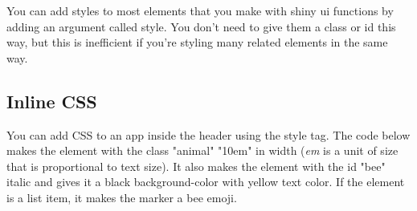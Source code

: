 \documentclass[
  oneside]{book}
\newenvironment{Shaded}{\begin{snugshade}}{\end{snugshade}}
\newcommand{\AttributeTok}[1]{\textcolor[rgb]{0.77,0.63,0.00}{#1}}
\newcommand{\FunctionTok}[1]{\textcolor[rgb]{0.00,0.00,0.00}{#1}}
\newcommand{\NormalTok}[1]{#1}
\newcommand{\SpecialCharTok}[1]{\textcolor[rgb]{0.00,0.00,0.00}{#1}}
\newcommand{\StringTok}[1]{\textcolor[rgb]{0.31,0.60,0.02}{#1}}
\begin{document}
You can add styles to most elements that you make with shiny ui functions by adding an argument called \AttributeTok{style}. You don't need to give them a \NormalTok{class} or \NormalTok{id} this way, but this is inefficient if you're styling many related elements in the same way.

\begin{Shaded}
\end{Shaded}

\hypertarget{inline-css}{%
\subsection{Inline CSS}\label{inline-css}}

You can add CSS to an app inside the header using the style tag. The code below makes the element with the \AttributeTok{class} \StringTok{"animal"} \StringTok{"10em"} in \NormalTok{width} (\emph{em} is a unit of size that is proportional to text size). It also makes the element with the \AttributeTok{id} \StringTok{"bee"} italic and gives it a black \AttributeTok{background-color} with yellow text \AttributeTok{color}. If the element is a list item, it makes the marker a bee emoji.
\end{document}
